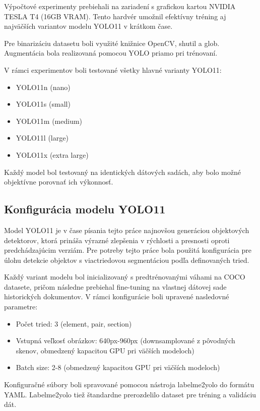     Výpočtové experimenty prebiehali na zariadení s grafickou kartou NVIDIA TESLA T4 (16GB VRAM). Tento hardvér umožnil efektívny tréning aj najväčších variantov modelu YOLO11 v krátkom čase.
    
    Pre binarizáciu datasetu boli využité knižnice OpenCV, shutil a glob. Augmentácia bola realizovaná pomocou YOLO priamo pri trénovaní.
    
    V rámci experimentov boli testované všetky hlavné varianty
    YOLO11:
    \begin{itemize}
        \item YOLO11n (nano)
        \item YOLO11s (small)
        \item YOLO11m (medium)
        \item YOLO11l (large)
        \item YOLO11x (extra large)
    \end{itemize}
    Každý model bol testovaný na identických dátových sadách, aby bolo možné objektívne porovnať ich výkonnosť.
    \subsection{Konfigurácia modelu YOLO11}
    Model YOLO11 je v čase písania tejto práce najnovšou generáciou objektových detektorov, ktorá prináša výrazné zlepšenia v rýchlosti a presnosti oproti predchádzajúcim verziám. Pre potreby tejto práce bola použitá konfigurácia pre úlohu detekcie objektov s viactriedovou segmentáciou podľa definovaných tried.

    Každý variant modelu bol inicializovaný s predtrénovanými váhami na COCO datasete, pričom následne prebiehal fine-tuning na vlastnej dátovej sade historických dokumentov. V rámci konfigurácie boli upravené nasledovné parametre: 
    
    \begin{itemize}
        \item Počet tried: 3 (element, pair, section)
        \item Vstupná veľkosť obrázkov: 640px-960px (downsamplované z pôvodných skenov, obmedzený kapacitou GPU pri väčších modeloch)
        \item Batch size: 2-8 (obmedzený kapacitou GPU pri väčších modeloch)
    \end{itemize}
    
    Konfiguračné súbory boli spravované pomocou nástroja labelme2yolo do formátu YAML. Labelme2yolo tiež štandardne prerozdelilo dataset pre tréning a validáciu dát.

